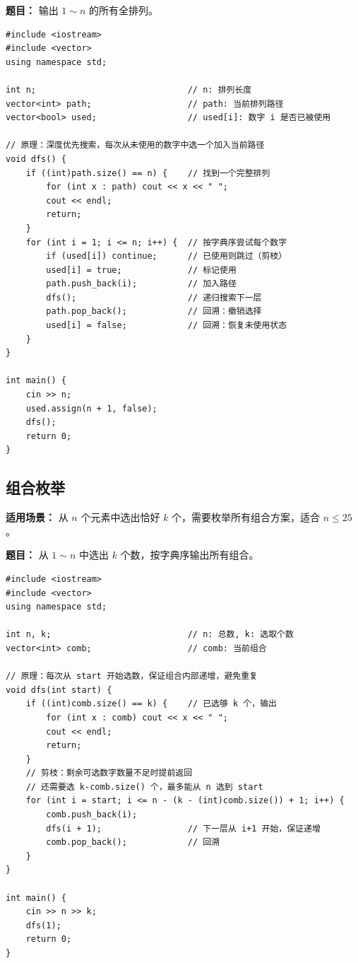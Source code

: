 \documentclass[12pt,a4paper]{ctexart}
\begin{document}
\textbf{题目：} 输出 $1 \sim n$ 的所有全排列。

\begin{lstlisting}[caption={DFS回溯生成全排列}]
#include <iostream>
#include <vector>
using namespace std;

int n;                              // n: 排列长度
vector<int> path;                   // path: 当前排列路径
vector<bool> used;                  // used[i]: 数字 i 是否已被使用

// 原理：深度优先搜索，每次从未使用的数字中选一个加入当前路径
void dfs() {
    if ((int)path.size() == n) {    // 找到一个完整排列
        for (int x : path) cout << x << " ";
        cout << endl;
        return;
    }
    for (int i = 1; i <= n; i++) {  // 按字典序尝试每个数字
        if (used[i]) continue;      // 已使用则跳过（剪枝）
        used[i] = true;             // 标记使用
        path.push_back(i);          // 加入路径
        dfs();                      // 递归搜索下一层
        path.pop_back();            // 回溯：撤销选择
        used[i] = false;            // 回溯：恢复未使用状态
    }
}

int main() {
    cin >> n;
    used.assign(n + 1, false);
    dfs();
    return 0;
}
\end{lstlisting}

\subsection{组合枚举}
\textbf{适用场景：} 从 $n$ 个元素中选出恰好 $k$ 个，需要枚举所有组合方案，适合 $n \le 25$。

\textbf{题目：} 从 $1 \sim n$ 中选出 $k$ 个数，按字典序输出所有组合。

\begin{lstlisting}[caption={DFS枚举组合（字典序）}]
#include <iostream>
#include <vector>
using namespace std;

int n, k;                           // n: 总数, k: 选取个数
vector<int> comb;                   // comb: 当前组合

// 原理：每次从 start 开始选数，保证组合内部递增，避免重复
void dfs(int start) {
    if ((int)comb.size() == k) {    // 已选够 k 个，输出
        for (int x : comb) cout << x << " ";
        cout << endl;
        return;
    }
    // 剪枝：剩余可选数字数量不足时提前返回
    // 还需要选 k-comb.size() 个，最多能从 n 选到 start
    for (int i = start; i <= n - (k - (int)comb.size()) + 1; i++) {
        comb.push_back(i);
        dfs(i + 1);                 // 下一层从 i+1 开始，保证递增
        comb.pop_back();            // 回溯
    }
}

int main() {
    cin >> n >> k;
    dfs(1);
    return 0;
}
\end{lstlisting}
\end{document}
